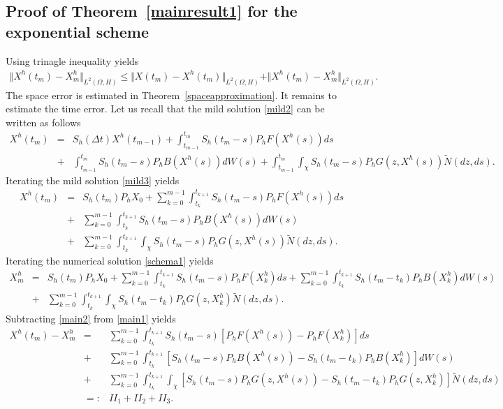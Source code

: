 \documentclass[review,12pt]{elsarticle}
\newcommand{\thmref}[1]{{Theorem~\ref{#1}}}
\begin{document}
\subsection{Proof of \thmref{mainresult1} for the exponential scheme}
Using trinagle inequality yields 
\begin{eqnarray}
\Vert X^h(t_m)-X^h_m\Vert_{L^2(\Omega, H)}\leq \Vert X(t_m)-X^h(t_m)\Vert_{L^2(\Omega, H)}+\Vert X^h(t_m)-X^h_m\Vert_{L^2(\Omega, H)}.
\end{eqnarray}
The space error is estimated in \thmref{spaceapproximation}. It remains to estimate the time error. Let us recall that the mild solution \eqref{mild2} can be written as follows
\begin{eqnarray}
\label{mild3}
X^h(t_m)&=&S_h(\Delta t)X^h(t_{m-1})+\int_{t_{m-1}}^{t_m}S_h(t_m-s)P_hF(X^h(s))ds\\
&+&\int_{t_{m-1}}^{t_m}S_h(t_m-s)P_hB(X^h(s))dW(s)+\int_{t_{m-1}}^{t_m}\int_{\chi}S_h(t_m-s)P_hG(z, X^h(s))\widetilde{N}(dz, ds).\nonumber
\end{eqnarray}
 Iterating the mild solution \eqref{mild3} yields
\begin{eqnarray}
\label{main1}
X^h(t_m)&=& S_h(t_m)P_hX_0+\sum_{k=0}^{m-1}\int_{t_k}^{t_{k+1}}S_h(t_{m}-s)P_hF(X^h(s))ds\nonumber\\
&+&\sum_{k=0}^{m-1}\int_{t_k}^{t_{k+1}}S_h(t_{m}-s)P_hB(X^h(s))dW(s)\nonumber\\
&+&\sum_{k=0}^{m-1}\int_{t_k}^{t_{k+1}}\int_{\chi}S_h(t_{m}-s)P_h G(z, X^h(s))\widetilde{N}(dz, ds).
\end{eqnarray}
Iterating the numerical solution \eqref{schema1} yields 
\begin{eqnarray}
\label{main2}
X^h_m&=& S_h(t_m)P_hX_0+\sum_{k=0}^{m-1}\int_{t_k}^{t_{k+1}}S_h(t_{m}-s)P_hF(X^h_k)ds+\sum_{k=0}^{m-1}\int_{t_k}^{t_{k+1}}S_h(t_m-t_k)P_hB(X^h_k)dW(s)\nonumber\\
&+&\sum_{k=0}^{m-1}\int_{t_k}^{t_{k+1}}\int_{\chi}S_h(t_m-t_k)P_h  G(z, X^h_k)\widetilde{N}(dz, ds).
\end{eqnarray}
Subtracting \eqref{main2} from \eqref{main1} yields
\begin{eqnarray}
\label{main3}
X^h(t_m)-X^h_m&=&\sum_{k=0}^{m-1}\int_{t_k}^{t_{k+1}}S_h(t_m-s)[P_hF(X^h(s))-P_hF(X^h_k)]ds\nonumber\\
&+&\sum_{k=0}^{m-1}\int_{t_k}^{t_{k+1}}[S_h(t_{m}-s)P_hB(X^h(s))-S_h(t_m-t_k)P_hB(X^h_k)]dW(s)\nonumber\\
&+&\sum_{k=0}^{m-1}\int_{t_k}^{t_{k+1}}\int_{\chi}[S_h(t_{m}-s)P_hG(z,X^h(s))-S_h(t_m-t_k)P_h G(z,X^h_k)]\widetilde{N}(dz,ds)\nonumber\\
&=:&II_1+II_2+II_3.
\end{eqnarray}
\end{document}
